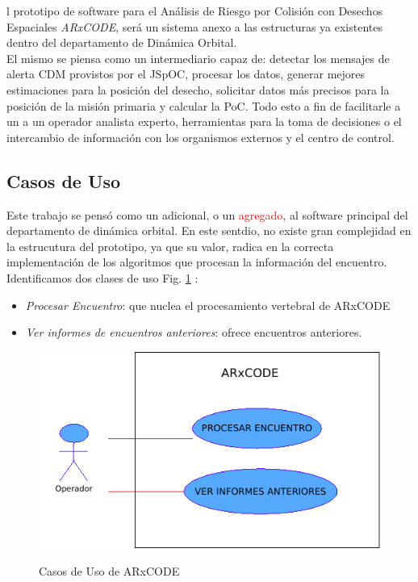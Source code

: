 l prototipo de software para el An\'alisis de Riesgo por Colisi\'on con Desechos Espaciales {\it{ARxCODE}}, ser\'a un sistema anexo a las estructuras ya existentes dentro del departamento de Din\'amica Orbital.\\
El mismo se piensa como un intermediario capaz de: detectar los mensajes de alerta CDM provistos por el JSpOC, procesar los datos, generar mejores estimaciones para la posici\'on del desecho, solicitar datos m\'as precisos para la posici\'on de la misi\'on primaria y calcular la PoC. Todo esto a fin de facilitarle a un a un operador analista experto, herramientas para la toma de decisiones o el intercambio de informaci\'on con los organismos externos y el centro de control.\\

\subsection{Casos de Uso}

Este trabajo se pens\'o como un adicional, o un \textcolor{red}{agregado}, al software principal del departamento de din\'amica orbital. En este sentdio, no existe gran complejidad en la estrucutura del prototipo, ya que su valor, radica en la correcta implementaci\'on de los algoritmos que procesan la informaci\'on del encuentro.\\
Identificamos dos clases de uso Fig. \ref{fig:casosuso} :\\
\begin{itemize}
 \item {\it{Procesar Encuentro}}: que nuclea el procesamiento vertebral de ARxCODE
 \item {\it{Ver informes de encuentros anteriores}}: ofrece encuentros anteriores.
\end{itemize}

\begin{figure}[h!]
  \centering
  \includegraphics[width=.5\textwidth]{imagenes/usecaseAR}
  \label{fig:casosuso}
  \caption{Casos de Uso de ARxCODE}
\end{figure}



